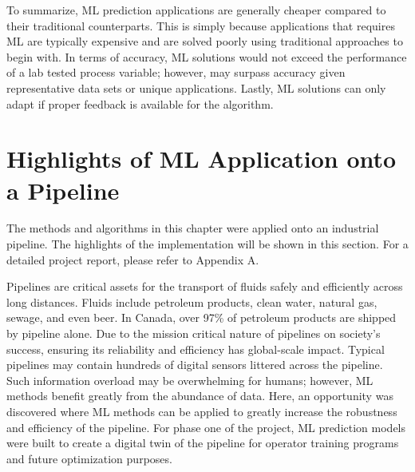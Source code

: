 To summarize, ML prediction applications are generally cheaper compared to their traditional counterparts.  This is simply because applications that requires ML are typically expensive and are solved poorly using traditional approaches to begin with.  In terms of accuracy, ML solutions would not exceed the performance of a lab tested process variable; however, may surpass accuracy given representative data sets or unique applications.  Lastly, ML solutions can only adapt if proper feedback is available for the algorithm. 

\section{Highlights of ML Application onto a Pipeline}

The methods and algorithms in this chapter were applied onto an industrial pipeline.  The highlights of the implementation will be shown in this section.  For a detailed project report, please refer to Appendix A.

Pipelines are critical assets for the transport of fluids safely and efficiently across long distances. Fluids include petroleum products, clean water, natural gas, sewage, and even beer. In Canada, over 97\% of petroleum products are shipped by pipeline alone.  Due to the mission critical nature of pipelines on society's success, ensuring its reliability and efficiency has global-scale impact.  Typical pipelines may contain hundreds of digital sensors littered across the pipeline.  Such information overload may be overwhelming for humans; however, ML methods benefit greatly from the abundance of data.  Here, an opportunity was discovered where ML methods can be applied to greatly increase the robustness and efficiency of the pipeline.  For phase one of the project, ML prediction models were built to create a digital twin of the pipeline for operator training programs and future optimization purposes.
